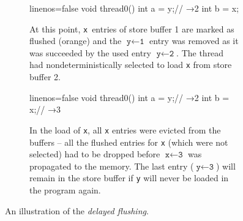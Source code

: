 \begin{figure}[tp]
\begin{subfigure}[t]{0.3\textwidth}
\begin{cppcode*}{linenos=false}
  void thread0() {
    int a = y;// →2
    int b = x;
  }
\end{cppcode*}
\caption{At this point, \texttt{x}~entries of store buffer 1 are marked as flushed (\textcolor{flushed}{orange}) and the \mbox{$\texttt{y} \leftarrow \texttt{1}$} entry was removed as it was succeeded by the used entry \mbox{$\texttt{y} \leftarrow \texttt{2}$}.
The thread had nondeterministically selected to load \texttt{x} from store buffer 2.
}\label{fig:mm:flushflagB}

\end{subfigure}
%
\hfill
%
\begin{subfigure}[t]{0.3\textwidth}
\begin{cppcode*}{linenos=false}
  void thread0() {
    int a = y;// →2
    int b = x;// →3
  }
\end{cppcode*}
\caption{
In the load of \texttt{x}, all \texttt{x} entries were evicted from the buffers -- all the flushed entries for \texttt{x} (which were not selected) had to be dropped before \mbox{$\texttt{x} \leftarrow \texttt{3}$} was propagated to the memory.
The last entry (\mbox{$\texttt{y} \leftarrow \texttt{3}$}) will remain in the store buffer if \texttt{y} will never be loaded in the program again.
}\label{fig:mm:flushflagC}

\end{subfigure}
\caption{An illustration of the \emph{delayed flushing}.}\label{fig:mm:flushflag}
\end{figure}

